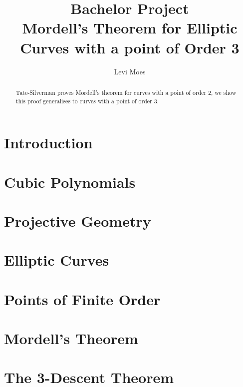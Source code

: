 \documentclass[11pt, oneside,a4paper]{article}
\title{Bachelor Project \\
  Mordell's Theorem for Elliptic Curves with a point of Order 3}
\author{Levi Moes}
\theoremstyle{definition}
\theoremstyle{remark}
\begin{document}
\maketitle

\begin{abstract}
  \noindent
  Tate-Silverman proves Mordell's theorem for curves with a point of order 2,
  we show this proof generalises to curves with a point of order 3.
\end{abstract}
\tableofcontents

\section{Introduction}
\label{sec:introduction}


\clearpage
\section{Cubic Polynomials}%
\label{sec:cubic_polynomials}


\clearpage
\section{Projective Geometry}%
\label{sec:projective_geometry}

\clearpage
\section{Elliptic Curves}%
\label{sec:elliptic_curves}


\clearpage
\section{Points of Finite Order}%
\label{sec:points_of_finite_order}


\clearpage
\section{Mordell's Theorem}%
\label{sec:mordell_s_theorem}


\clearpage
\section{The 3-Descent Theorem}%
\label{sec:the_3_descent_theorem}

\end{document}
